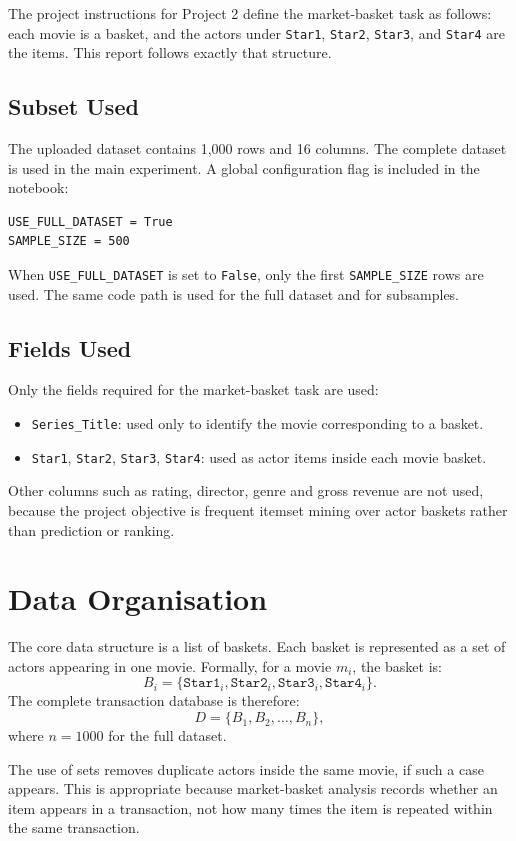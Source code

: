 \documentclass[11pt,a4paper]{article}
\begin{document}
The project instructions for Project 2 define the market-basket task as follows: each movie is a basket, and the actors under \texttt{Star1}, \texttt{Star2}, \texttt{Star3}, and \texttt{Star4} are the items. This report follows exactly that structure.

\subsection{Subset Used}
The uploaded dataset contains 1,000 rows and 16 columns. The complete dataset is used in the main experiment. A global configuration flag is included in the notebook:
\begin{verbatim}
USE_FULL_DATASET = True
SAMPLE_SIZE = 500
\end{verbatim}
When \texttt{USE\_FULL\_DATASET} is set to \texttt{False}, only the first \texttt{SAMPLE\_SIZE} rows are used. The same code path is used for the full dataset and for subsamples.

\subsection{Fields Used}
Only the fields required for the market-basket task are used:
\begin{itemize}[leftmargin=*]
    \item \texttt{Series\_Title}: used only to identify the movie corresponding to a basket.
    \item \texttt{Star1}, \texttt{Star2}, \texttt{Star3}, \texttt{Star4}: used as actor items inside each movie basket.
\end{itemize}
Other columns such as rating, director, genre and gross revenue are not used, because the project objective is frequent itemset mining over actor baskets rather than prediction or ranking.

\section{Data Organisation}
The core data structure is a list of baskets. Each basket is represented as a set of actors appearing in one movie. Formally, for a movie $m_i$, the basket is:
\[
B_i = \{\texttt{Star1}_i, \texttt{Star2}_i, \texttt{Star3}_i, \texttt{Star4}_i\}.
\]
The complete transaction database is therefore:
\[
D = \{B_1, B_2, \ldots, B_n\},
\]
where $n = 1000$ for the full dataset.

The use of sets removes duplicate actors inside the same movie, if such a case appears. This is appropriate because market-basket analysis records whether an item appears in a transaction, not how many times the item is repeated within the same transaction.
\end{document}
